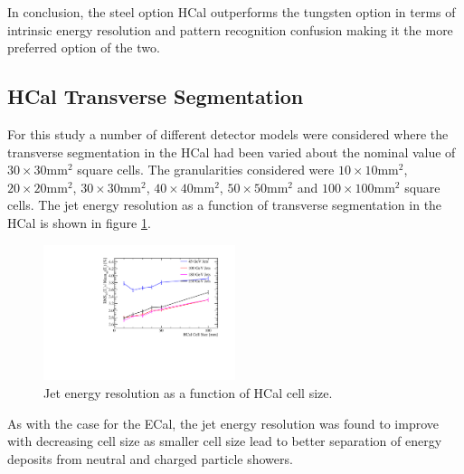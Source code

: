 In conclusion, the steel option HCal outperforms the tungsten option in terms of intrinsic energy resolution and pattern recognition confusion making it the more preferred option of the two.


\subsection{HCal Transverse Segmentation}
\label{sec:hcalcells}
For this study a number of different detector models were considered where the transverse segmentation in the HCal had been varied about the nominal value of $30 \times 30 \text{mm}^{2}$ square cells.  The granularities considered were $10 \times 10 \text{mm}^{2}$, $20 \times 20 \text{mm}^{2}$, $30 \times 30 \text{mm}^{2}$, $40 \times 40 \text{mm}^{2}$, $50 \times 50 \text{mm}^{2}$ and $100 \times 100 \text{mm}^{2}$ square cells.  The jet energy resolution as a function of transverse segmentation in the HCal is shown in figure \ref{fig:hcalcellsize}.

\begin{figure}
\centering
\includegraphics[width=0.5\textwidth]{OptimisationStudies/Plots/JetEnergyResolutions/JER_vs_HCalCellSize.pdf}
\caption[Jet energy resolution as a function of HCal cell size.]{Jet energy resolution as a function of HCal cell size.}
\label{fig:hcalcellsize}
\end{figure}

As with the case for the ECal, the jet energy resolution was found to improve with decreasing cell size as smaller cell size lead to better separation of energy deposits from neutral and charged particle showers.

